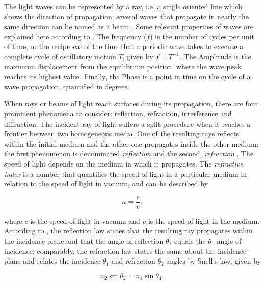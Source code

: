 The light waves can be represented by a ray, i.e. a single oriented line which shows the direction of propagation; several waves that propagate in nearly the same direction can be named as a beam \cite{halliday2013fundamentals}. Some relevant properties of waves are explained here according to . The frequency ($f$) is the number of cycles per unit of time, or the reciprocal of the time that a periodic wave takes to execute a complete cycle of oscillatory motion $T$, given by $f = T^{-1}$. The Amplitude is the maximum displacement from the equilibrium position, where the wave peak reaches its highest value. Finally, the Phase is a point in time on the cycle of a wave propagation, quantified in degrees.

When rays or beams of light reach surfaces during its propagation, there are four prominent phenomena to consider: reflection, refraction, interference and diffraction. The incident ray of light suffers a split procedure when it reaches a frontier between two homogeneous media. One of the resulting rays reflects within the initial medium and the other one propagates inside the other medium; the first phenomenon is denominated \emph{reflection} and the second, \emph{refraction} \cite{born1999principles}. The speed of light depends on the medium in which it propagates. The \emph{refractive index} is a number that quantifies the speed of light in a particular medium in relation to the speed of light in vacuum, and can be described by

\begin{equation}
    \label{eqn:refractive_index}
       n = \frac{c}{v},
\end{equation}

\noindent where $\mathit{c}$ is the speed of light in vacuum and $\mathit{v}$ is the speed of light in the medium. According to , the reflection law states that the resulting ray propagates within the incidence plane and that the angle of reflection $\mathit{\theta^{'}_{1}}$ equals the $\mathit{\theta_{1}}$ angle of incidence; comparably, the refraction law states the same about the incidence plane and relates the incidence $\mathit{\theta_{1}}$ and refraction $\mathit{\theta_{2}}$ angles by Snell's law, given by

\begin{equation}
    \label{eqn:snells_law}
       n_{2}\sin{\theta_{2}} = n_{1}\sin{\theta_{1}},
\end{equation}

